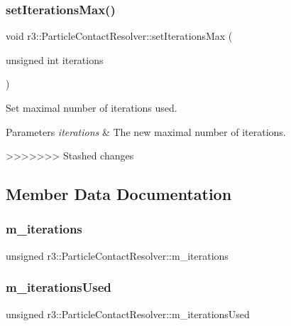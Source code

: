 \subsubsection{\texorpdfstring{set\+Iterations\+Max()}{setIterationsMax()}}
{\footnotesize\ttfamily void r3\+::\+Particle\+Contact\+Resolver\+::set\+Iterations\+Max (\begin{DoxyParamCaption}\item[{unsigned int}]{iterations }\end{DoxyParamCaption})}



Set maximal number of iterations used. 


\begin{DoxyParams}{Parameters}
{\em iterations} & The new maximal number of iterations. \\
\hline
\end{DoxyParams}

>>>>>>> Stashed changes

\subsection{Member Data Documentation}
\mbox{\label{classr3_1_1_particle_contact_resolver_ae8b844211cf1c0f5e99191cee9f4a88f}} 
\subsubsection{\texorpdfstring{m\+\_\+iterations}{m\_iterations}}
{\footnotesize\ttfamily unsigned r3\+::\+Particle\+Contact\+Resolver\+::m\+\_\+iterations\hspace{0.3cm}{\ttfamily [protected]}}

\mbox{\label{classr3_1_1_particle_contact_resolver_a07536069a9a6a73c45794baf8579b845}} 
\subsubsection{\texorpdfstring{m\+\_\+iterations\+Used}{m\_iterationsUsed}}
{\footnotesize\ttfamily unsigned r3\+::\+Particle\+Contact\+Resolver\+::m\+\_\+iterations\+Used\hspace{0.3cm}{\ttfamily [protected]}}



